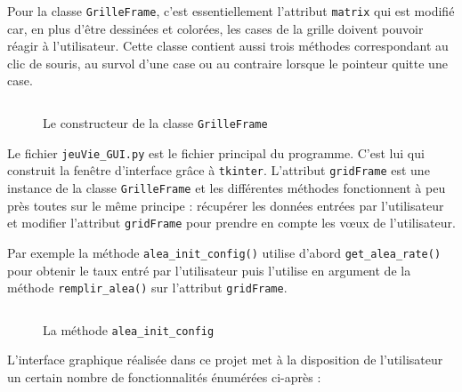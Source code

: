\documentclass[11pt]{article}
\begin{document}
Pour la classe \texttt{GrilleFrame}, c'est essentiellement l'attribut \texttt{matrix} qui est modifié car, en plus d'être dessinées et colorées, les cases de la grille doivent pouvoir réagir à l'utilisateur. Cette classe contient aussi trois méthodes correspondant au clic de souris, au survol d'une case ou au contraire lorsque le pointeur quitte une case.

\begin{figure}[!h]
\inputminted[numbersep=2pt,linenos=true,frame=single,bgcolor=black!5,firstline=15,lastline=46]{python}{../code/grilleFrame.py} \vspace*{-1cm}
\caption{Le constructeur de la classe \texttt{GrilleFrame}}
\end{figure}

\newpage

Le fichier \texttt{jeuVie_GUI.py} est le fichier principal du programme. C'est lui qui construit la fenêtre d'interface grâce à \texttt{tkinter}. L'attribut \texttt{gridFrame} est une instance de la classe \texttt{GrilleFrame} et les différentes méthodes fonctionnent à peu près toutes sur le même principe : récupérer les données entrées par l'utilisateur et modifier l'attribut \texttt{gridFrame} pour prendre en compte les v\oe{}ux de l'utilisateur.

Par exemple la méthode \texttt{alea_init_config()} utilise d'abord \texttt{get_alea_rate()} pour obtenir le taux entré par l'utilisateur puis l'utilise en argument de la méthode \texttt{remplir_alea()} sur l'attribut \texttt{gridFrame}.

\begin{figure}[!h]
\inputminted[numbersep=2pt,linenos=true,frame=single,bgcolor=black!5,firstline=136,lastline=140]{python}{../code/jeuVie_GUI.py} \vspace*{-0.5cm}
\caption{La méthode \texttt{alea_init_config}}
\end{figure}

L'interface graphique réalisée dans ce projet met à la disposition de l'utilisateur un certain nombre de fonctionnalités énumérées ci-après :
\end{document}
